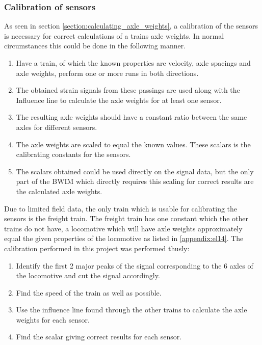 \subsubsection{Calibration of sensors}
As seen in section \ref{section:calculating_axle_weights}, a calibration of the sensors is necessary for correct calculations of a trains axle weights. In normal circumstances this could be done in the following manner.
\begin{enumerate}
	\item Have a train, of which the known properties are velocity, axle spacings and axle weights, perform one or more runs in both directions.
	\item The obtained strain signals from these passings are used along with the Influence line to calculate the axle weights for at least one sensor.
	\item The resulting axle weights should have a constant ratio between the same axles for different sensors.
	\item The axle weights are scaled to equal the known values. These scalars is the calibrating constants for the sensors.
	\item The scalars obtained could be used directly on the signal data, but the only part of the BWIM which directly requires this scaling for correct results are the calculated axle weights.
\end{enumerate}
Due to limited field data, the only train which is usable for calibrating the sensors is the freight train. The freight train has one constant which the other trains do not have, a locomotive which will have axle weights approximately equal the given properties of the locomotive as listed in \ref{appendix:el14}. The calibration performed in this project was performed thusly:
\begin{enumerate}
	\item Identify the first 2 major peaks of the signal corresponding to the 6 axles of the locomotive and cut the signal accordingly.
	\item Find the speed of the train as well as possible.
	\item Use the influence line found through the other trains to calculate the axle weights for each sensor.
	\item Find the scalar giving correct results for each sensor.
\end{enumerate}
